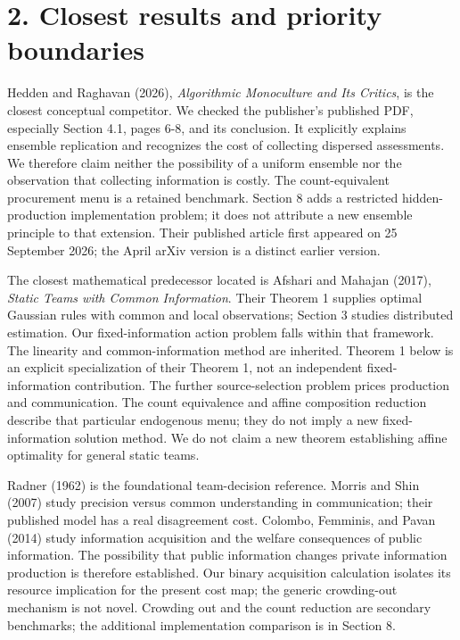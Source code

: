 \documentclass[
  11pt,
]{article}
\begin{document}
\section{2. Closest results and priority
boundaries}\label{closest-results-and-priority-boundaries}

Hedden and Raghavan (2026), \emph{Algorithmic Monoculture and Its
Critics}, is the closest conceptual competitor. We checked the
publisher's published PDF, especially Section 4.1, pages 6-8, and its
conclusion. It explicitly explains ensemble replication and recognizes
the cost of collecting dispersed assessments. We therefore claim neither
the possibility of a uniform ensemble nor the observation that
collecting information is costly. The count-equivalent procurement menu
is a retained benchmark. Section 8 adds a restricted hidden-production
implementation problem; it does not attribute a new ensemble principle
to that extension. Their published article first appeared on 25
September 2026; the April arXiv version is a distinct earlier version.

The closest mathematical predecessor located is Afshari and Mahajan
(2017), \emph{Static Teams with Common Information}. Their Theorem 1
supplies optimal Gaussian rules with common and local observations;
Section 3 studies distributed estimation. Our fixed-information action
problem falls within that framework. The linearity and
common-information method are inherited. Theorem 1 below is an explicit
specialization of their Theorem 1, not an independent fixed-information
contribution. The further source-selection problem prices production and
communication. The count equivalence and affine composition reduction
describe that particular endogenous menu; they do not imply a new
fixed-information solution method. We do not claim a new theorem
establishing affine optimality for general static teams.

Radner (1962) is the foundational team-decision reference. Morris and
Shin (2007) study precision versus common understanding in
communication; their published model has a real disagreement cost.
Colombo, Femminis, and Pavan (2014) study information acquisition and
the welfare consequences of public information. The possibility that
public information changes private information production is therefore
established. Our binary acquisition calculation isolates its resource
implication for the present cost map; the generic crowding-out mechanism
is not novel. Crowding out and the count reduction are secondary
benchmarks; the additional implementation comparison is in Section 8.
\end{document}

